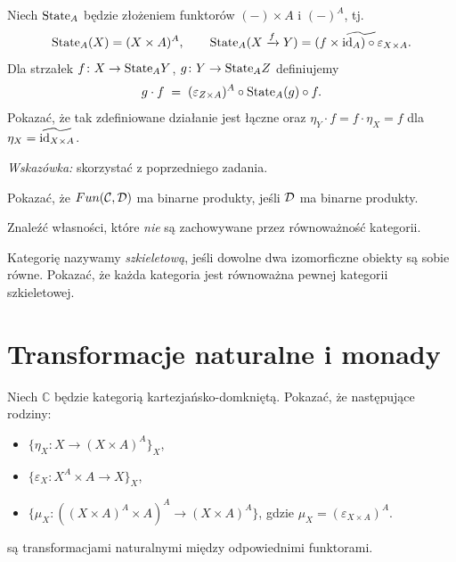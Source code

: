 \begin{zadanie}\label{zad:state}
Niech $\mathrm{State}_A$ będzie złożeniem funktorów $(-)\times A$ i $(-)^A$, tj.
\[
\mathrm{State}_A(X) = (X\times A)^A, \qquad \mathrm{State}_A(X\xrightarrow{f} Y) = \widetilde{(f\times\mathrm{id}_A)\circ\varepsilon_{X\times A}}.
\]
Dla strzałek $f\colon X\to\mathrm{State}_A Y$, $g\colon Y\to\mathrm{State}_A Z$ definiujemy
\[
g\cdot f \;=\; (\varepsilon_{Z\times A})^A \circ \mathrm{State}_A(g) \circ f.
\]
Pokazać, że tak zdefiniowane działanie jest łączne oraz $\eta_Y\cdot f = f\cdot \eta_X = f$ dla $\eta_X = \widetilde{\mathrm{id}_{X\times A}}$.

\emph{Wskazówka:} skorzystać z poprzedniego zadania.
\end{zadanie}

\begin{zadanie}
Pokazać, że $Fun(\mathcal{C},\mathcal{D})$ ma binarne produkty, jeśli $\mathcal{D}$ ma binarne produkty.
\end{zadanie}

\begin{zadanie}
Znaleźć własności, które \emph{nie} są zachowywane przez równoważność kategorii.
\end{zadanie}

\begin{zadanie}
Kategorię nazywamy \emph{szkieletową}, jeśli dowolne dwa izomorficzne obiekty są sobie równe. Pokazać, że każda kategoria jest równoważna pewnej kategorii szkieletowej. 
\end{zadanie}

\clearpage
\section{Transformacje naturalne i monady}

\begin{zadanie}\label{zad:nat-ccc}
  Niech $\mathbb{C}$ będzie kategorią kartezjańsko-domkniętą. Pokazać, że następujące rodziny:
  \begin{itemize}
    \item $\{\eta_X: X\to (X\times A)^A\}_X$, 
    \item $\{\varepsilon_X: X^A\times A\to X\}_X$,
    \item $\{\mu_X: \left ( (X\times A)^A \times A\right )^A \to (X\times A)^A \}$, gdzie 
        $\mu_X =  (\varepsilon_{X\times A})^A$. 
  \end{itemize}
  są transformacjami naturalnymi między odpowiednimi funktorami. 
\end{zadanie} 


